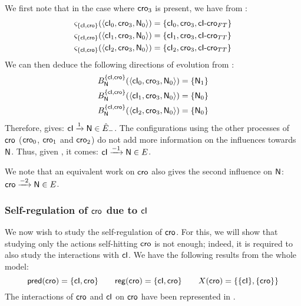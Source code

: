 We first note that in the case where $\mathsf{cro}_3$ is present, we have from :
\begin{align*}
  \varsigma_{\{ \mathsf{cI}, \mathsf{cro} \}}(\mbox{$\langle \mathsf{cI}_0, \mathsf{cro}_3, \mathsf{N}_0 \rangle$}) &= \{ \mathsf{cI}_0, \mathsf{cro}_3, \mathsf{cI\mbox{-}cro}_{FT} \} \\
  \varsigma_{\{ \mathsf{cI}, \mathsf{cro} \}}(\mbox{$\langle \mathsf{cI}_1, \mathsf{cro}_3, \mathsf{N}_0 \rangle$}) &= \{ \mathsf{cI}_1, \mathsf{cro}_3, \mathsf{cI\mbox{-}cro}_{TT} \} \\
  \varsigma_{\{ \mathsf{cI}, \mathsf{cro} \}}(\mbox{$\langle \mathsf{cI}_2, \mathsf{cro}_3, \mathsf{N}_0 \rangle$}) &= \{ \mathsf{cI}_2, \mathsf{cro}_3, \mathsf{cI\mbox{-}cro}_{TT} \}
\end{align*}
We can then deduce the following directions of evolution from :
\begin{align*}
  B_{\mathsf{N}}^{\{ \mathsf{cI}, \mathsf{cro} \}}(\mbox{$\langle \mathsf{cI}_0, \mathsf{cro}_3, \mathsf{N}_0 \rangle$}) &= \{ \mathsf{N}_1 \} \\
  B_{\mathsf{N}}^{\{ \mathsf{cI}, \mathsf{cro} \}}(\mbox{$\langle \mathsf{cI}_1, \mathsf{cro}_3, \mathsf{N}_0 \rangle$}) &= \{ \mathsf{N}_0 \} \\
  B_{\mathsf{N}}^{\{ \mathsf{cI}, \mathsf{cro} \}}(\mbox{$\langle \mathsf{cI}_2, \mathsf{cro}_3, \mathsf{N}_0 \rangle$}) &= \{ \mathsf{N}_0 \}
\end{align*}
Therefore,  gives: $\mathsf{cI} \xrightarrow{1} \mathsf{N} \in \hat{E}_-$.
The configurations using the other processes of $\mathsf{cro}$ ($\mathsf{cro}_0$, $\mathsf{cro}_1$ and $\mathsf{cro}_2$)
do not add more information on the influences towards $\mathsf{N}$.
Thus, given , it comes: $\mathsf{cI} \xrightarrow{- 1} \mathsf{N} \in E$.

We note that an equivalent work on $\mathsf{cro}$ also gives the second influence on $\mathsf{N}$:
$\mathsf{cro} \xrightarrow{- 2} \mathsf{N} \in E$.



\subsubsection{Self-regulation of $\mathsf{cro}$ due to $\mathsf{cI}$}

We now wish to study the self-regulation of $\mathsf{cro}$.
For this, we will show that studying only the actions self-hitting $\mathsf{cro}$ is not enough;
indeed, it is required to also study the interactions with $\mathsf{cI}$.
We have the following results from the whole model:
\[\mathsf{pred}(\mathsf{cro}) = \{ \mathsf{cI}, \mathsf{cro} \} \qquad
  \mathsf{reg}({\mathsf{cro}}) = \{ \mathsf{cI}, \mathsf{cro} \} \qquad
  X(\mathsf{cro}) = \{ \{ \mathsf{cI} \}, \{ \mathsf{cro} \} \}\]
The interactions of $\mathsf{cro}$ and $\mathsf{cI}$ on $\mathsf{cro}$ have been represented in
.

